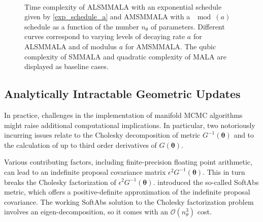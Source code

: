 \documentclass[twoside,11pt]{article}
\begin{document}
\begin{figure}[t]
	\centering
	 \\
	\caption{
		Time complexity of ALSMMALA with an exponential schedule given by \eqref{exp_schedule_a} and AMSMMALA with a $\mod{(a)}$ 
		schedule as a function of the number $n_{\theta}$ of parameters. Different curves correspond to varying levels of 
		decaying rate $a$ for ALSMMALA and of modulus $a$ for AMSMMALA. The qubic complexity of SMMALA and quadratic complexity
		of MALA are displayed as baseline cases.
	}
	\label{fig:alsmmala_amsmmala_schedule}
\end{figure}

\subsection{Analytically Intractable Geometric Updates}

In practice, challenges in the implementation of manifold MCMC algorithms might raise additional computational implications.
In particular, two notoriously incurring issues relate to the Cholesky decomposition of metric $G^{-1}(\boldsymbol{\theta})$ 
and to the calculation of up to third order derivatives of $G(\boldsymbol{\theta})$.

Various contributing factors, including finite-precision floating point arithmetic, can lead to an indefinite proposal
covariance matrix $\epsilon^2 G^{-1}(\boldsymbol{\theta})$. This in turn breaks the Cholesky factorization of 
$\epsilon^2 G^{-1}(\boldsymbol{\theta})$. \cite{bet__age} introduced the so-called SoftAbs metric, which offers a 
positive-definite approximation of the indefinite proposal covariance. The working SoftAbs solution to the Cholesky 
factorization problem involves an eigen-decomposition, so it comes with an $\mathcal{O}(n_{\theta}^3)$ cost.
\end{document}
